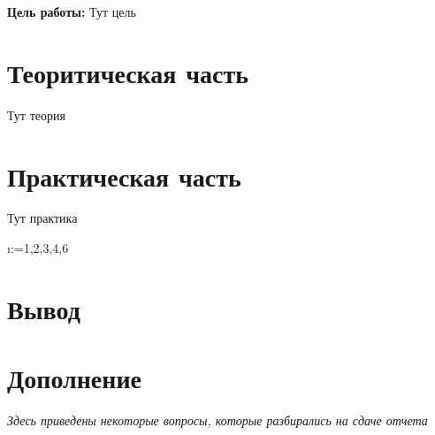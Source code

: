 



\def\labauthors{Понур К.А., Хавьер, Шиков А.П.}
\def\labgroup{450}
\def\labnumber{1}
\def\labtheme{Согласованные фильтры}


\newpage

{\bfseries Цель работы:} 
Тут цель

\section{Теоритическая часть}
Тут теория

\newpage
\section{Практическая часть}
Тут практика

\makeatletter
\@for\i:={1,2,3,4,6}\do{}
\makeatother

\section{Вывод}


\newpage
\section{Дополнение}
\textit{Здесь приведены некоторые вопросы, которые разбирались на сдаче отчета}


